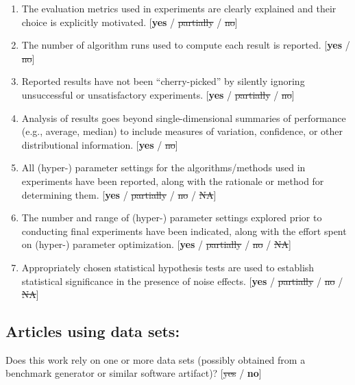 \documentclass[]{jair}
\renewcommand{\bf}[1]{\textbf{#1}}  %
\begin{document}
\begin{enumerate}
    make and version of operating system; names and versions of relevant software 
    libraries and frameworks. 
    [\bf{yes} / \st{partially} / \st{no}]
    \item 
    The evaluation metrics used in experiments are clearly explained and 
    their choice is explicitly motivated. \newline
    [\bf{yes} / \st{partially} / \st{no}]
    \item 
    The number of algorithm runs used to compute each result is reported. \newline
    [\bf{yes} / \st{no}]
    \item 
    Reported results have not been ``cherry-picked'' by silently ignoring unsuccessful 
    or unsatisfactory experiments. \newline
    [\bf{yes} / \st{partially} / \st{no}]
    \item 
    Analysis of results goes beyond single-dimensional summaries of performance 
    (e.g., average, median) to include measures of variation, confidence, or 
    other distributional information. \newline
    [\bf{yes} / \st{no}]
    \item 
    All (hyper-) parameter settings for the algorithms/methods used in experiments 
    have been reported, along with the rationale or method for determining them. \newline
    [\bf{yes} / \st{partially} / \st{no} / \st{NA}]
    \item 
    The number and range of (hyper-) parameter settings explored prior to 
    conducting final experiments have been indicated, along with the effort spent on 
    (hyper-) parameter optimization. \newline
    [\bf{yes} / \st{partially} / \st{no} / \st{NA}]
    \item 
    Appropriately chosen statistical hypothesis tests are used to establish 
    statistical significance in the presence of noise effects. \newline
    [\bf{yes} / \st{partially} / \st{no} / \st{NA}]
\end{enumerate}


\subsection*{Articles using data sets:}
Does this work rely on one or more data sets 
(possibly obtained from a benchmark generator or similar software artifact)? 
[\st{yes} / \bf{no}]
\end{document}
